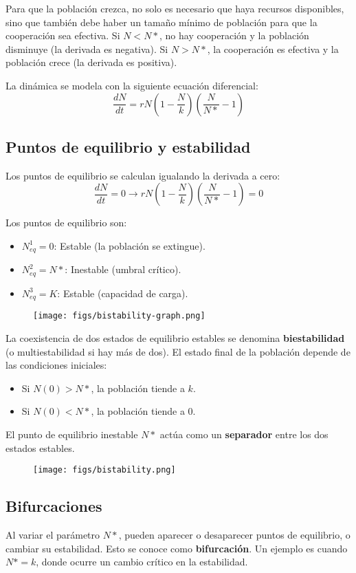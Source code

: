 Para que la población crezca, no solo es necesario que haya recursos disponibles, sino que también debe haber un tamaño mínimo de población para que la cooperación sea efectiva. Si $N < N*$, no hay cooperación y la población disminuye (la derivada es negativa). Si $N > N*$, la cooperación es efectiva y la población crece (la derivada es positiva).

La dinámica se modela con la siguiente ecuación diferencial:
$$\frac{dN}{dt} = rN (1 - \frac{N}{k}) (\frac{N}{N*} - 1)$$

\subsection{Puntos de equilibrio y estabilidad}
Los puntos de equilibrio se calculan igualando la derivada a cero:
$$\frac{dN}{dt} = 0 \rightarrow rN(1 - \frac{N}{k})(\frac{N}{N*} - 1) = 0$$

Los puntos de equilibrio son:
\begin{itemize}
\item $N^1_{eq} = 0$: Estable (la población se extingue).
\item $N^2_{eq} = N*$: Inestable (umbral crítico).
\item $N^3_{eq} = K$: Estable (capacidad de carga).
\end{itemize}

\begin{figure}[h]
\centering
\texttt{[image: figs/bistability-graph.png]}
\end{figure}

La coexistencia de dos estados de equilibrio estables se denomina \textbf{biestabilidad} (o multiestabilidad si hay más de dos). El estado final de la población depende de las condiciones iniciales:
\begin{itemize}
\item Si $N(0) > N*$, la población tiende a $k$.
\item Si $N(0) < N*$, la población tiende a 0.
\end{itemize}

El punto de equilibrio inestable $N*$ actúa como un \textbf{separador} entre los dos estados estables.

\begin{figure}[h]
\centering
\texttt{[image: figs/bistability.png]}
\end{figure}

\subsection{Bifurcaciones}
Al variar el parámetro $N*$, pueden aparecer o desaparecer puntos de equilibrio, o cambiar su estabilidad. Esto se conoce como \textbf{bifurcación}. Un ejemplo es cuando $N* = k$, donde ocurre un cambio crítico en la estabilidad.

